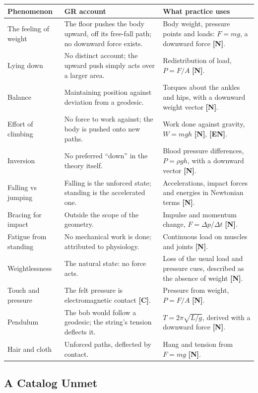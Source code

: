 \documentclass[11pt,a4paper]{article}
\newcommand{\reg}[1]{\textsf{\small\textbf{[#1]}}}
\newcommand{\RN}{\reg{N}}
\newcommand{\RC}{\reg{C}}
\newcommand{\REN}{\reg{EN}}
\begin{document}
\begin{longtable}{>{\raggedright\arraybackslash}p{3.3cm}>{\raggedright\arraybackslash}p{5.3cm}>{\raggedright\arraybackslash}p{5.2cm}}
\toprule
\textbf{Phenomenon} & \textbf{GR account} & \textbf{What practice uses} \\
\midrule
\endhead
The feeling of weight & The floor pushes the body upward, off its free-fall path; no downward force exists. & Body weight, pressure points and loads: $F = mg$, a downward force \RN{}. \\[3pt]
Lying down & No distinct account; the upward push simply acts over a larger area. & Redistribution of load, $P = F/A$ \RN{}. \\[3pt]
Balance & Maintaining position against deviation from a geodesic. & Torques about the ankles and hips, with a downward weight vector \RN{}. \\[3pt]
Effort of climbing & No force to work against; the body is pushed onto new paths. & Work done against gravity, $W = mgh$ \RN{}, \REN{}. \\[3pt]
Inversion & No preferred ``down'' in the theory itself. & Blood pressure differences, $P = \rho g h$, with a downward vector \RN{}. \\[3pt]
Falling vs jumping & Falling is the unforced state; standing is the accelerated one. & Accelerations, impact forces and energies in Newtonian terms \RN{}. \\[3pt]
Bracing for impact & Outside the scope of the geometry. & Impulse and momentum change, $F = \Delta p/\Delta t$ \RN{}. \\[3pt]
Fatigue from standing & No mechanical work is done; attributed to physiology. & Continuous load on muscles and joints \RN{}. \\[3pt]
Weightlessness & The natural state: no force acts. & Loss of the usual load and pressure cues, described as the absence of weight \RN{}. \\[3pt]
Touch and pressure & The felt pressure is electromagnetic contact \RC{}. & Pressure from weight, $P = F/A$ \RN{}. \\[3pt]
Pendulum & The bob would follow a geodesic; the string's tension deflects it. & $T = 2\pi\sqrt{L/g}$, derived with a downward force \RN{}. \\[3pt]
Hair and cloth & Unforced paths, deflected by contact. & Hang and tension from $F = mg$ \RN{}. \\
\bottomrule
\end{longtable}

\subsection{A Catalog Unmet}
\end{document}
